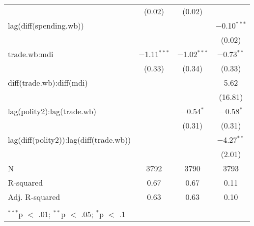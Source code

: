\begin{table}[!htbp]
\begin{tabular}{@{\extracolsep{5pt}}lccc}
  & (0.02) & (0.02) &  \\ 
  lag(diff(spending.wb)) &  &  & $-$0.10$^{***}$ \\ 
  &  &  & (0.02) \\ 
  trade.wb:mdi & $-$1.11$^{***}$ & $-$1.02$^{***}$ & $-$0.73$^{**}$ \\ 
  & (0.33) & (0.34) & (0.33) \\ 
  diff(trade.wb):diff(mdi) &  &  & 5.62 \\ 
  &  &  & (16.81) \\ 
  lag(polity2):lag(trade.wb) &  & $-$0.54$^{*}$ & $-$0.58$^{*}$ \\ 
  &  & (0.31) & (0.31) \\ 
  lag(diff(polity2)):lag(diff(trade.wb)) &  &  & $-$4.27$^{**}$ \\ 
  &  &  & (2.01) \\ 
 N & 3792 & 3790 & 3793 \\ 
R-squared & 0.67 & 0.67 & 0.11 \\ 
Adj. R-squared & 0.63 & 0.63 & 0.10 \\ 
\hline \\[-1.8ex] 
\multicolumn{4}{l}{$^{***}$p $<$ .01; $^{**}$p $<$ .05; $^{*}$p $<$ .1} \\ 
\end{tabular} 
\end{table} 
